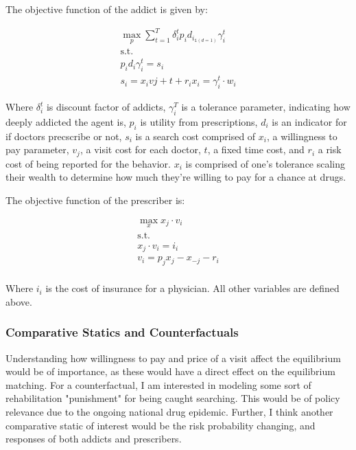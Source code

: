 \documentclass[11pt,a4paper]{article}
\begin{document}
The objective function of the addict is given by:

\begin{gather*}
  \max_p \sum\limits_{t=1}^{T} \delta^t_i p_id_i_{\mathbb{1}(d=1)}\gamma_i^t \\
  \text{s.t.} \\
  p_id_i\gamma_i^t = s_i \\
  s_i = x_ivj + t + r_i
  x_i = \gamma_i^t\cdot w_i
\end{gather*}

Where $\delta_i^t$ is discount factor of addicts, $\gamma_i^T$ is a tolerance parameter, indicating how deeply addicted the agent is, $p_i$ is utility from prescriptions, $d_i$ is an indicator for if doctors precscribe or not, 
$s_i$ is a search cost comprised of $x_i$, a willingness to pay parameter, $v_j$, a visit cost for each doctor, $t$, a fixed time cost, and $r_i$ a risk cost of being reported for the behavior. $x_i$ is comprised
of one's tolerance scaling their wealth to determine how much they're willing to pay for a chance at drugs.

The objective function of the prescriber is:

\begin{gather*}
  \max_x x_j\cdot v_i \\
  \text{s.t.} \\
  x_j\cdot v_i = i_i \\
  v_i = p_jx_j - x_{-j} - r_i \\
\end{gather*}

Where $i_i$ is the cost of insurance for a physician. All other variables are defined above. 

\subsubsection*{Comparative Statics and Counterfactuals}
\label{subsubsec:comparative&counterfactuals}

Understanding how willingness to pay and price of a visit affect the equilibrium would be of importance, as these would have a direct effect on the equilibrium matching.
For a counterfactual, I am interested in modeling some sort of rehabilitation "punishment" for being caught searching. This would be of policy relevance due to the ongoing national drug epidemic.
Further, I think another comparative static of interest would be the risk probability changing, and responses of both addicts and prescribers.
\end{document}
